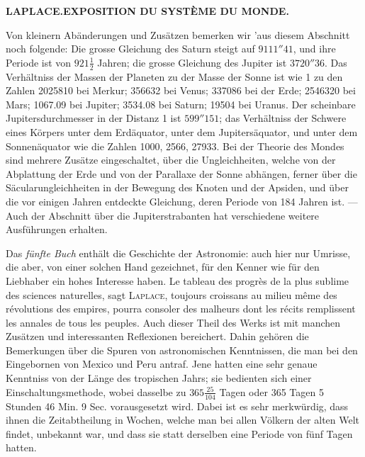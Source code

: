 \clearpage
\thispagestyle{empty}
\noindent{}%
\makebox[12mm][l]{}%
\parbox[t]{\dimexpr\linewidth-24mm\relax}{\centering\footnotesize\bfseries LAPLACE.\enspace EXPOSITION DU SYSTÈME DU MONDE.\par}%
\par\nobreak\medskip
Von kleinern Abänderungen und Zusätzen bemerken wir ’aus diesem Abschnitt noch folgende: Die grosse Gleichung des Saturn steigt auf $9111''41$, und ihre Periode ist von $921\frac{1}{2}$ Jahren; die grosse Gleichung des Jupiter ist $3720''36$. Das Verhältniss der Massen der Planeten zu der Masse der Sonne ist wie 1 zu den Zahlen 2025810 bei Merkur; 356632 bei Venus; 337086 bei der Erde; 2546320 bei Mars; 1067.09 bei Jupiter; 3534.08 bei Saturn; 19504 bei Uranus. Der scheinbare Jupitersdurchmesser in der Distanz 1 ist $599''151$; das Verhältniss der Schwere eines Körpers unter dem Erdäquator, unter dem Jupitersäquator, und unter dem Sonnenäquator wie die Zahlen 1000, 2566, 27933. Bei der Theorie des Mondes sind mehrere Zusätze eingeschaltet, über die Ungleichheiten, welche von der Abplattung der Erde und von der Parallaxe der Sonne abhängen, ferner über die Säcularungleichheiten in der Bewegung des Knoten und der Apsiden, und über die vor einigen Jahren entdeckte Gleichung, deren Periode von 184 Jahren ist. --- Auch der Abschnitt über die Jupiterstrabanten hat verschiedene weitere Ausführungen erhalten.

Das \emph{fünfte Buch} enthält die Geschichte der Astronomie: auch hier nur Umrisse, die aber, von einer solchen Hand gezeichnet, für den Kenner wie für den Liebhaber ein hohes Interesse haben. Le tableau des progrès de la plus sublime des sciences naturelles, sagt \textsc{Laplace}, toujours croissans au milieu même des révolutions des empires, pourra consoler des malheurs dont les récits remplissent les annales de tous les peuples. Auch dieser Theil des Werks ist mit manchen Zusätzen und interessanten Reflexionen bereichert. Dahin gehören die Bemerkungen über die Spuren von astronomischen Kenntnissen, die man bei den Eingebornen von Mexico und Peru antraf. Jene hatten eine sehr genaue Kenntniss von der Länge des tropischen Jahrs; sie bedienten sich einer Einschaltungsmethode, wobei dasselbe zu $365\frac{25}{104}$ Tagen oder 365 Tagen 5 Stunden 46 Min. 9 Sec. vorausgesetzt wird. Dabei ist es sehr merkwürdig, dass ihnen die Zeitabtheilung in Wochen, welche man bei allen Völkern der alten Welt findet, unbekannt war, und dass sie statt derselben eine Periode von fünf Tagen hatten.

